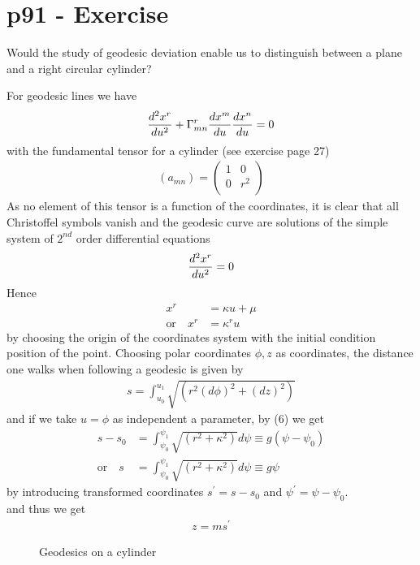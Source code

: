\section{p91 - Exercise}
\begin{tcolorbox}
Would the study of geodesic deviation enable us to distinguish between a plane and a right circular cylinder?
\end{tcolorbox}
For geodesic lines we have
\begin{align}
\dv[2]{x^r}{u} + \Gamma^r_{mn}\dv{x^m}{u}\dv{x^n}{u} = 0\\
\end{align}
with the fundamental tensor for a cylinder (see exercise page 27)
\begin{align} 
(a_{mn}) = \begin{pmatrix}
 1& 0 \\
0 & r^2 \\
\end{pmatrix}
\end{align}
As no element of this tensor is a function of the coordinates, it is clear that all Christoffel symbols vanish and the geodesic curve are solutions of the simple system of $2^{nd}$ order differential equations
\begin{align}
\dv[2]{x^r}{u}  = 0
\end{align}
Hence
\begin{align}
x^r  &= \kappa u + \mu\\
\text{or}\quad x^r &= \kappa^r u
\end{align}
by choosing the origin of the coordinates system with the initial condition position of the point.
Choosing polar coordinates $\phi, z$ as coordinates, the distance one walks when following a geodesic is given by
\begin{align}
 s= \int_{u_0}^{u_1}\sqrt{(r^2(d\phi)^2 + (dz)^2)}
\end{align}
and if we take $u=\phi$ as independent a parameter, by (6) we get 
\begin{align}
 s-s_0 &= \int_{\psi_0}^{\psi_1}\sqrt{(r^2 + \kappa^2)}d\psi \equiv g(\psi - \psi_0)\\
 \text{or}\quad s&= \int_{\psi_0}^{\psi_1}\sqrt{(r^2 + \kappa^2)}d\psi \equiv g\psi
\end{align}
by introducing transformed coordinates $s^{'}= s-s_0$ and $\psi^{'} =\psi - \psi_0$.\\
and thus we get 
\begin{align}
 z = m s^{'}
\end{align}
\begin{figure}[H]
\begin{minipage}[t]{.4\textwidth}
\vspace{0pt}

\end{minipage}\hfill
\caption{Geodesics on a cylinder}
\label{fig:fig_p91_153_a}
\end{figure}
